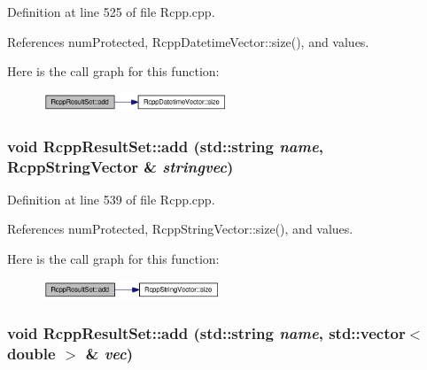 Definition at line 525 of file Rcpp.cpp.

References numProtected, RcppDatetimeVector::size(), and values.

Here is the call graph for this function:\nopagebreak
\begin{figure}[H]
\begin{center}
\leavevmode
\includegraphics[width=157pt]{classRcppResultSet_ac8cade970247a377e8dbebf1c79a86c_cgraph}
\end{center}
\end{figure}
\hypertarget{classRcppResultSet_10d01a24ef006c1ff14ca7e95fb9e0ea}{
\subsubsection[add]{\setlength{\rightskip}{0pt plus 5cm}void RcppResultSet::add (std::string {\em name}, \/  {\bf RcppStringVector} \& {\em stringvec})}}
\label{classRcppResultSet_10d01a24ef006c1ff14ca7e95fb9e0ea}




Definition at line 539 of file Rcpp.cpp.

References numProtected, RcppStringVector::size(), and values.

Here is the call graph for this function:\nopagebreak
\begin{figure}[H]
\begin{center}
\leavevmode
\includegraphics[width=151pt]{classRcppResultSet_10d01a24ef006c1ff14ca7e95fb9e0ea_cgraph}
\end{center}
\end{figure}
\hypertarget{classRcppResultSet_2b4575ca5ccc390bc5437b1be4718ca6}{
\subsubsection[add]{\setlength{\rightskip}{0pt plus 5cm}void RcppResultSet::add (std::string {\em name}, \/  std::vector$<$ double $>$ \& {\em vec})}}
\label{classRcppResultSet_2b4575ca5ccc390bc5437b1be4718ca6}




